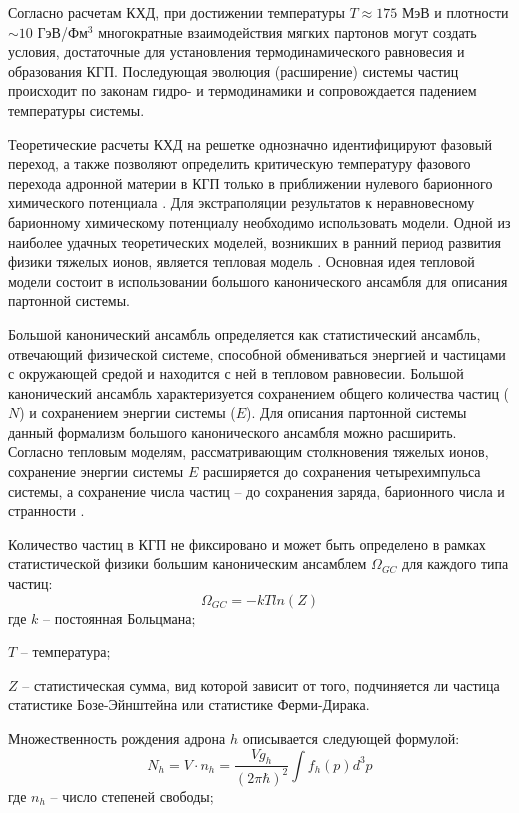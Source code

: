 Согласно расчетам КХД, при достижении температуры $T\approx175$ МэВ и плотности $\sim10$ ГэВ/Фм$^3$ многократные взаимодействия мягких партонов могут создать условия, достаточные для установления термодинамического равновесия и образования КГП\cite{QGP}. Последующая эволюция (расширение) системы частиц происходит по законам гидро- и термодинамики и сопровождается падением температуры системы. 

Теоретические расчеты КХД на решетке однозначно идентифицируют фазовый переход, а также позволяют определить критическую температуру фазового перехода адронной материи в КГП только в приближении нулевого барионного химического потенциала \cite{LatticeQCD_PhaseTransition1, LatticeQCD_PhaseTransition2}. 
Для экстраполяции результатов к неравновесному барионному химическому потенциалу необходимо использовать модели. Одной из наиболее удачных теоретических моделей, возникших в ранний период развития физики тяжелых ионов, является тепловая модель \cite{ThermalModel}. Основная идея тепловой модели состоит в использовании большого канонического ансамбля для описания партонной системы. 

Большой канонический ансамбль определяется как статистический ансамбль, отвечающий физической системе, способной обмениваться энергией и частицами с окружающей средой и находится с ней в тепловом равновесии.  Большой канонический ансамбль характеризуется сохранением общего количества частиц ($N$) и сохранением энергии системы ($E$). Для описания партонной системы данный формализм  большого канонического ансамбля можно расширить. Согласно тепловым моделям, рассматривающим столкновения тяжелых ионов, сохранение энергии системы $E$ расширяется до сохранения четырехимпульса системы, а сохранение числа частиц -- до сохранения заряда, барионного числа и странности \cite{ThermalModel}. 

Количество частиц в КГП не фиксировано и может быть определено в рамках статистической физики большим каноническим ансамблем $\Omega_{GC}$ для каждого типа частиц:
$$\Omega_{GC} = -kT ln(Z)$$
где $k$ – постоянная Больцмана;
 
$T$ – температура;

$Z$ -- статистическая сумма, вид которой зависит от того, подчиняется ли частица статистике Бозе-Эйнштейна или статистике Ферми-Дирака.

Множественность рождения адрона $h$ описывается следующей формулой:
$$ N_h = V\cdot n_h = \frac{V g_h}{(2 \pi \hbar)^2} \int f_h(p)d^3p$$
где $n_h$ – число степеней свободы;

